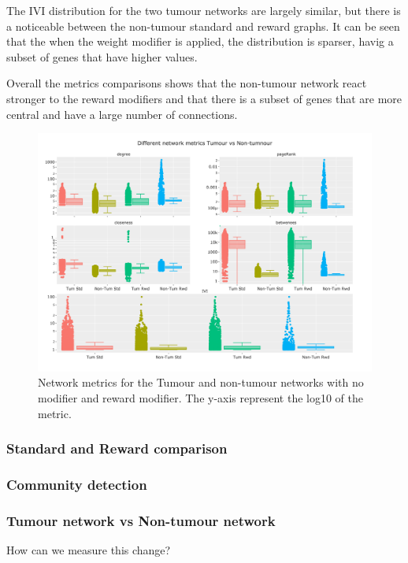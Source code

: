 The IVI distribution for the two tumour networks are largely similar, but there is a noticeable between the non-tumour standard and reward graphs. It can be seen that the when the weight modifier is applied, the distribution is sparser, havig a subset of genes that have higher values.

Overall the metrics comparisons shows that the non-tumour network react stronger to the reward modifiers and that there is a subset of genes that are more central and have a large number of connections.





\begin{figure}[!htb]    
    \centering
    \includegraphics[width=1.0\textwidth,height=0.7\textheight,keepaspectratio]{Sections/Network_II/validation/network_comparison.png}
    \caption{Network metrics for the Tumour and non-tumour networks with no modifier and reward modifier. The y-axis represent the log10 of the metric. }
    \label{fig:N_II:net_metrics_comp}
\end{figure}



\subsubsection{Standard and Reward comparison}

\subsubsection{Community detection}

\subsubsection{Tumour network vs Non-tumour network}

How can we measure this change?